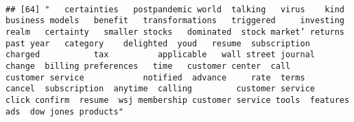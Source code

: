 \documentclass[
]{article}
\begin{document}
\begin{verbatim}
                                                                                                                                                                                                                                                                                                                                                                                                                                                                            
## [64] "   certainties   postpandemic world  talking   virus    kind  business models   benefit   transformations   triggered     investing realm   certainty   smaller stocks   dominated  stock market’ returns   past year   category    delighted  youd   resume  subscription    charged           tax          applicable   wall street journal           change  billing preferences   time   customer center  call         customer service            notified  advance     rate  terms           cancel  subscription  anytime  calling         customer service         click confirm  resume  wsj membership customer service tools  features ads  dow jones products"                                                                                                                                                                                                                                                                                                                                                                                                                                                                                                                                                                                                                                                                                                                                                                                                                                                                                                                                                                                                                                                                                                                                                                                                                                                                                                                                                                                                                                                                                                                                                                                                                                                                                                                                                                                                                                                                                                                                                                                                                                                                                                                                                                                                                                                                                       
\end{verbatim}
\end{document}
